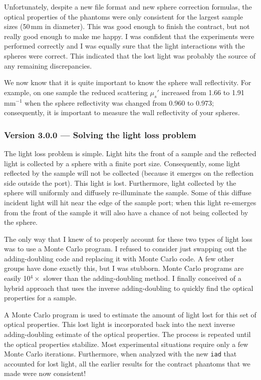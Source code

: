 \documentclass{article}
\newcommand\iadprog{\texttt{iad}}
\begin{document}
Unfortunately, despite a new file format and new sphere correction formulas,
the optical properties of the phantoms were only consistent for the largest
sample sizes (50\,mm in diameter).  This was good enough to finish
the contract, but not really good enough to make me happy.  I was confident
that the experiments were performed correctly and I was equally sure that
the light interactions with the spheres were correct.  This indicated that the
lost light was probably the source of any remaining discrepancies.

We now know that it is quite important to know the sphere
wall reflectivity.  For example, on one sample the reduced scattering $\mu_s'$
increased from 1.66 to 1.91\,mm$^{-1}$ when the sphere reflectivity was 
changed from 0.960 to 0.973; consequently, it is important to measure
the wall reflectivity of your spheres.

\subsubsection*{Version 3.0.0 --- Solving the light loss problem}

The light loss problem is simple.  Light hits the front of a sample and the
reflected light is collected by a sphere with a finite port size.  Consequently,
some light reflected by the sample will not be collected (because it emerges on
the reflection side outside the port).  This light is lost.
Furthermore, light collected by the sphere will uniformly and diffusely 
re-illuminate the sample.  Some of this diffuse incident light will hit near the
edge of the sample port; when this light re-emerges from the front of
the sample it will also have a chance of not being collected by the sphere.

The only way that I knew of to properly account for these two types of light
loss was to use a Monte Carlo program.  I refused to consider just swapping
out the adding-doubling code and replacing it with Monte Carlo code.
A few other groups have done exactly this, but I was stubborn.
Monte Carlo programs are easily 10$^4\times$
slower than the adding-doubling method.  I finally conceived of a hybrid 
approach that uses the inverse adding-doubling to quickly find the optical properties
for a sample.  

A Monte Carlo program is used to estimate the amount of light lost for this
set of optical properties.  This lost light is incorporated back into the next
inverse adding-doubling estimate of the optical properties.  The process is
repeated until the optical properties stabilize.  Most experimental situations
require only a few Monte Carlo iterations.  Furthermore, when analyzed with the
new \iadprog{} that accounted for lost light, all the earlier results for the
contract phantoms that we made were now consistent!
\end{document}
